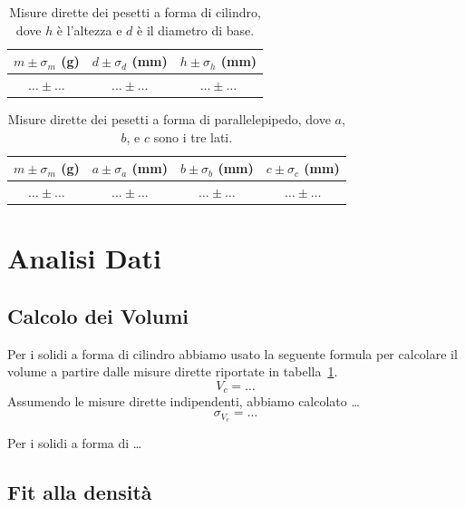 \documentclass{article}
\begin{document}
\begin{table}[]
    \centering
    \begin{tabular}{c|c|c}
      $m\pm \sigma_m$ (g)   & $d\pm\sigma_d$ (mm)  & $h\pm\sigma_h$ (mm)\\
      \hline
     $\ldots \pm \ldots$    & $\ldots \pm \ldots$ &$\ldots \pm \ldots$\\
    \end{tabular}
    \caption{Misure dirette dei pesetti a forma di cilindro, dove $h$ \`e l'altezza e $d$ \`e il diametro di base.}
    \label{tab:dir_cilindri}
\end{table}

\begin{table}[]
    \centering
    \begin{tabular}{c|c|c|c}
      $m\pm \sigma_m$ (g)   & $a\pm\sigma_a$ (mm)  & $b\pm\sigma_b$ (mm)& $c\pm\sigma_c$ (mm)\\
      \hline
       $\ldots \pm \ldots$  & $\ldots \pm \ldots$ & $\ldots \pm \ldots$ & $\ldots \pm \ldots$\\
    \end{tabular}
    \caption{Misure dirette dei pesetti a forma di parallelepipedo, dove $a$, $b$, e $c$ sono i tre lati.}
    \label{tab:dir_parallelepipedi}
\end{table}


\section{Analisi Dati}
\subsection{Calcolo dei Volumi}
Per i solidi a forma di cilindro abbiamo usato la seguente formula per calcolare il volume a partire dalle misure dirette riportate in tabella~\ref{tab:dir_cilindri}.
\begin{equation}
    V_c = \ldots
\end{equation}
Assumendo le misure dirette indipendenti, abbiamo calcolato \ldots %
\begin{equation}
    \sigma_{V_c} = \ldots
\end{equation}

Per i solidi a forma di \ldots

\subsection{Fit alla densit\`a}
\end{document}
